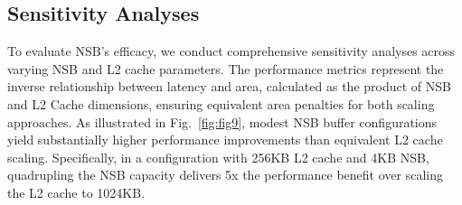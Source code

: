 \subsection{Sensitivity Analyses}
\vspace{-3pt}

To evaluate NSB's efficacy, we conduct comprehensive sensitivity analyses across varying NSB and L2 cache parameters. 
The performance metrics represent the inverse relationship between latency and area, calculated as the product of NSB and L2 Cache dimensions, ensuring equivalent area penalties for both scaling approaches.
As illustrated in Fig.~\ref{fig:fig9}, modest NSB buffer configurations yield substantially higher performance improvements than equivalent L2 cache scaling. Specifically, in a configuration with 256KB L2 cache and 4KB NSB, quadrupling the NSB capacity delivers 5x the performance benefit over scaling the L2 cache to 1024KB. 